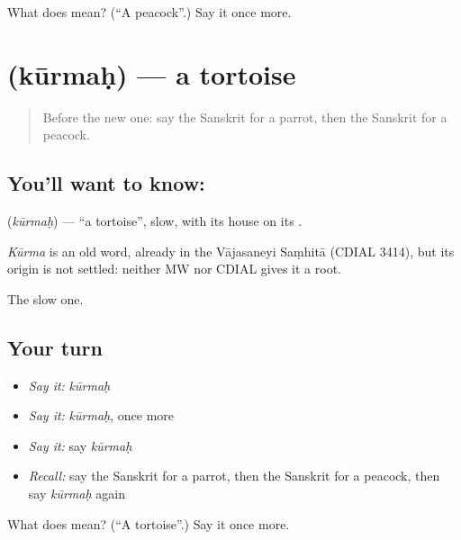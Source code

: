 \begin{tcolorbox}[breakable,colback=teal!4,colframe=teal!35!black,title={Before you move on}]
What does  mean? (\textquotedblleft{}A peacock\textquotedblright{}.) Say it once more.
\end{tcolorbox}
\section[\texorpdfstring{\sk{कूर्मः} (kūrmaḥ)}{कूर्मः (kūrmaḥ)}]{ (kūrmaḥ) — a tortoise}

\label{lesson:SA-C80-tortoise}



\begin{quote}
Before the new one: say the Sanskrit for a parrot, then the Sanskrit for a peacock.
\end{quote}

\subsection*{You'll want to know: }
\textbf{} (\emph{kūrmaḥ}) — \textquotedblleft{}a tortoise\textquotedblright{}, slow, with its house on its \textbf{}.

\begin{cousinweb}
\emph{Kūrma} is an old word, already in the Vājasaneyi Saṃhitā (CDIAL 3414), but its origin is not settled: neither MW nor CDIAL gives it a root.
\end{cousinweb}

\begin{grammarlens}[title={What you've built}]
The slow one.
\end{grammarlens}

\subsection*{Your turn}
\begin{itemize}
\raggedright
  \item \emph{Say it:} \emph{kūrmaḥ}
  \item \emph{Say it:} \emph{kūrmaḥ}, once more
  \item \emph{Say it:} say \emph{kūrmaḥ}
  \item \emph{Recall:} say the Sanskrit for a parrot, then the Sanskrit for a peacock, then say \emph{kūrmaḥ} again
\end{itemize}

\begin{tcolorbox}[breakable,colback=teal!4,colframe=teal!35!black,title={Before you move on}]
What does  mean? (\textquotedblleft{}A tortoise\textquotedblright{}.) Say it once more.
\end{tcolorbox}

